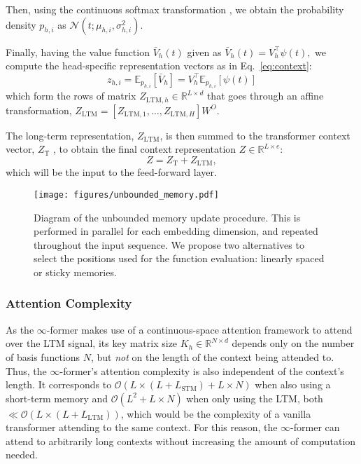 \documentclass[11pt]{article}
\begin{document}
Then, using the continuous softmax transformation \citep{martins2020sparse}, we obtain the probability density $p_{h,i}$ as ${\mathcal{N}(t; \mu_{h,i}, \sigma_{h,i}^2)}$.

Finally, having the value function $\bar{V}_{h}(t)$ given as
    ${\bar{V}_{h}(t)= V_{h}^\top  \psi(t),}$
we compute the head-specific representation vectors as in Eq.~\ref{eq:context}:
\begin{equation}
    z_{h,i} = \mathbb{E}_{p_{h,i}}[\bar{V}_{h}] = V_{h}^\top \mathbb{E}_{p_{h,i}}[\psi(t)]
\end{equation}
which form the rows of matrix ${Z_{{\mathrm{LTM}},h} \in \mathbb{R}^{L \times d}}$ that goes through an affine transformation, ${Z_{\mathrm{LTM}} = [Z_{{\mathrm{LTM}},1},\dots,Z_{{\mathrm{LTM}},{H}}]W^O}$.

The long-term representation, $Z_{\mathrm{LTM}}$, is then summed to the transformer context vector, $Z_{\mathrm{T}}$
, to obtain the final context representation ${Z \in \mathbb{R}^{L\times e}}$:
\begin{equation}
    Z =  Z_{\mathrm{T}} + Z_{\mathrm{LTM}},
\end{equation}
which will be the input to the feed-forward layer.

\begin{figure*}[t]
    \centering
    \texttt{[image: figures/unbounded\_memory.pdf]}
    \caption{Diagram of the unbounded memory update procedure. This is performed in parallel for each embedding dimension, and repeated throughout the input sequence. We propose two alternatives to select the positions used for the function evaluation: linearly spaced or sticky memories.}
    \label{fig:unbounded_memory}
\end{figure*}

\subsubsection{Attention Complexity}
\label{sec:complexity}
As the $\infty$-former makes use of a continuous-space attention framework \citep{martins2020sparse} to attend over the LTM signal, its key matrix size ${K_{h}\in \mathbb{R}^{N \times d}}$ depends only on the number of basis functions $N$, but \textit{not} on the length of the context being attended to. Thus, the \mbox{$\infty$-former's} attention complexity is also independent of the context's length. 
It corresponds to  ${\mathcal{O}(L\times (L+L_\mathrm{STM}) + L\times N)}$ when also using a short-term memory and ${\mathcal{O}(L^2 + L\times N)}$ when only using the LTM, both $\ll \mathcal{O}(L \times (L+L_{\mathrm{LTM}}))$, which would be the complexity of a vanilla transformer attending to the same context. 
For this reason, the $\infty$-former can attend to arbitrarily long contexts without increasing the amount of computation needed.
\end{document}
